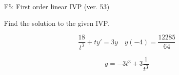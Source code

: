 \begin{exercise}
  \begin{exerciseTitle}F5: First order linear IVP (ver. 53)\end{exerciseTitle}
  \begin{exerciseStatement}
    
Find the solution to the given IVP.

    
\[\frac{18}{t^{3}} +ty'= 3 y \hspace{1em} y( -4 ) = \frac{12285}{64}\]

  \end{exerciseStatement}
  \begin{exerciseAnswer}
    
\[y= -3 t^ 3 +3 \frac{1}{t^{3}}\]

  \end{exerciseAnswer}
\end{exercise}
